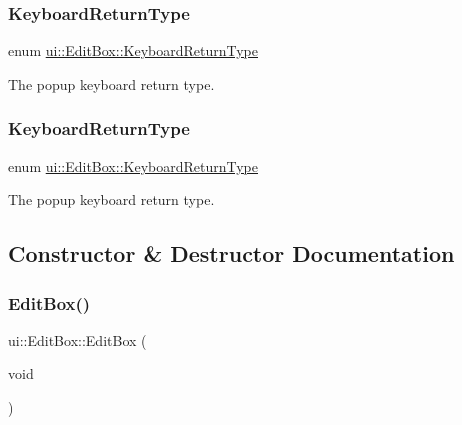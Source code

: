 \subsubsection{\texorpdfstring{Keyboard\+Return\+Type}{KeyboardReturnType}\hspace{0.1cm}{\footnotesize\ttfamily [1/2]}}
{\footnotesize\ttfamily enum \hyperlink{classui_1_1EditBox_a1e1285b6f742975b26bdeb8108ca6e51}{ui\+::\+Edit\+Box\+::\+Keyboard\+Return\+Type}\hspace{0.3cm}{\ttfamily [strong]}}

The popup keyboard return type. \mbox{\label{classui_1_1EditBox_a1e1285b6f742975b26bdeb8108ca6e51}} 
\subsubsection{\texorpdfstring{Keyboard\+Return\+Type}{KeyboardReturnType}\hspace{0.1cm}{\footnotesize\ttfamily [2/2]}}
{\footnotesize\ttfamily enum \hyperlink{classui_1_1EditBox_a1e1285b6f742975b26bdeb8108ca6e51}{ui\+::\+Edit\+Box\+::\+Keyboard\+Return\+Type}\hspace{0.3cm}{\ttfamily [strong]}}

The popup keyboard return type. 

\subsection{Constructor \& Destructor Documentation}
\mbox{\label{classui_1_1EditBox_af6c48b01269aeacecf0adcd4936a3f43}} 
\subsubsection{\texorpdfstring{Edit\+Box()}{EditBox()}\hspace{0.1cm}{\footnotesize\ttfamily [1/2]}}
{\footnotesize\ttfamily ui\+::\+Edit\+Box\+::\+Edit\+Box (\begin{DoxyParamCaption}\item[{void}]{ }\end{DoxyParamCaption})}

